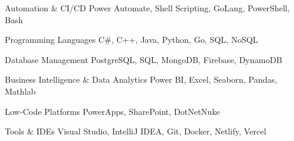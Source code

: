 
\begin{cvskills}

  \cvskill
    {Automation \& CI/CD} %
    {Power Automate, Shell Scripting, GoLang, PowerShell, Bash} %

  \cvskill
    {Programming Languages} %
    {C\#, C++, Java, Python, Go, SQL, NoSQL} %

  \cvskill
    {Database Management} %
    {PostgreSQL, SQL, MongoDB, Firebase, DynamoDB} %

  \cvskill
    {Business Intelligence \& Data Analytics} %
    {Power BI, Excel, Seaborn, Pandas, Mathlab} %

  \cvskill
    {Low-Code Platforms} %
    {PowerApps, SharePoint, DotNetNuke} %

  \cvskill
    {Tools \& IDEs} %
    {Visual Studio, IntelliJ IDEA, Git, Docker, Netlify, Vercel} %

\end{cvskills}
